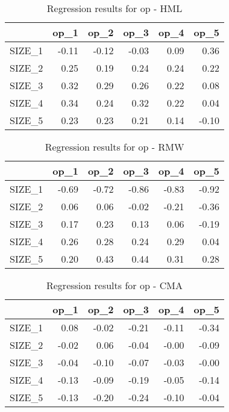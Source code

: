 \begin{table}[ht]
\centering
\caption{Regression results for op - HML} 
\begin{tabular}{rrrrrr}
  \hline
 & op\_1 & op\_2 & op\_3 & op\_4 & op\_5 \\ 
  \hline
SIZE\_1 & -0.11 & -0.12 & -0.03 & 0.09 & 0.36 \\ 
  SIZE\_2 & 0.25 & 0.19 & 0.24 & 0.24 & 0.22 \\ 
  SIZE\_3 & 0.32 & 0.29 & 0.26 & 0.22 & 0.08 \\ 
  SIZE\_4 & 0.34 & 0.24 & 0.32 & 0.22 & 0.04 \\ 
  SIZE\_5 & 0.23 & 0.23 & 0.21 & 0.14 & -0.10 \\ 
   \hline
\end{tabular}
\end{table}


\begin{table}[ht]
\centering
\caption{Regression results for op - RMW} 
\begin{tabular}{rrrrrr}
  \hline
 & op\_1 & op\_2 & op\_3 & op\_4 & op\_5 \\ 
  \hline
SIZE\_1 & -0.69 & -0.72 & -0.86 & -0.83 & -0.92 \\ 
  SIZE\_2 & 0.06 & 0.06 & -0.02 & -0.21 & -0.36 \\ 
  SIZE\_3 & 0.17 & 0.23 & 0.13 & 0.06 & -0.19 \\ 
  SIZE\_4 & 0.26 & 0.28 & 0.24 & 0.29 & 0.04 \\ 
  SIZE\_5 & 0.20 & 0.43 & 0.44 & 0.31 & 0.28 \\ 
   \hline
\end{tabular}
\end{table}


\begin{table}[ht]
\centering
\caption{Regression results for op - CMA} 
\begin{tabular}{rrrrrr}
  \hline
 & op\_1 & op\_2 & op\_3 & op\_4 & op\_5 \\ 
  \hline
SIZE\_1 & 0.08 & -0.02 & -0.21 & -0.11 & -0.34 \\ 
  SIZE\_2 & -0.02 & 0.06 & -0.04 & -0.00 & -0.09 \\ 
  SIZE\_3 & -0.04 & -0.10 & -0.07 & -0.03 & -0.00 \\ 
  SIZE\_4 & -0.13 & -0.09 & -0.19 & -0.05 & -0.14 \\ 
  SIZE\_5 & -0.13 & -0.20 & -0.24 & -0.10 & -0.04 \\ 
   \hline
\end{tabular}
\end{table}


